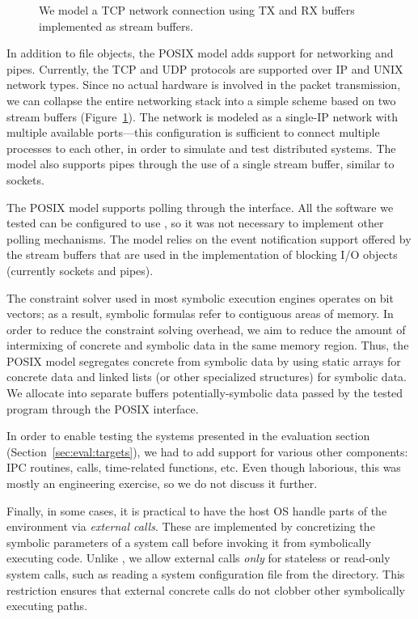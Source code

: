 \begin{figure}
  \centering
  \caption{We model a TCP network connection using TX and RX buffers implemented as stream buffers.}
  \label{fig:networkmodel}
\end{figure}

In addition to file objects, the POSIX model adds support for networking and pipes.
%
Currently, the TCP and UDP protocols are supported over IP and UNIX network types. Since no actual hardware is involved in the packet transmission, we can collapse the entire networking stack into a simple scheme based on two stream buffers (Figure~\ref{fig:networkmodel}). The network is modeled as a single-IP network with multiple available ports---this configuration is sufficient to connect multiple processes to each other, in order to simulate and test distributed systems. The model also supports pipes through the use of a single stream buffer, similar to sockets.

The POSIX model supports polling through the  interface.
%
All the software we tested can be configured to use , so it was not necessary to implement other polling mechanisms.  The  model relies on the event notification support offered by the stream buffers that are used in the implementation of blocking I/O objects (currently sockets and pipes).

The constraint solver used in most symbolic execution engines operates on bit vectors; as a result, symbolic formulas refer to contiguous areas of memory.
%
In order to reduce the constraint solving overhead, we aim to reduce the amount of intermixing of concrete and symbolic data in the same memory region.  Thus, the POSIX model segregates concrete from symbolic data by using static arrays for concrete data and linked lists (or other specialized structures) for symbolic data.  We allocate into separate buffers potentially-symbolic data passed by the tested program through the POSIX interface.

In order to enable testing the systems presented in the evaluation section (Section~\ref{sec:eval:targets}), we had to add support for various other components: IPC routines,  calls, time-related functions, etc.
%
Even though laborious, this was mostly an engineering exercise, so we do not discuss it further.

Finally, in some cases, it is practical to have the host OS handle parts of the environment via \emph{external calls}.
%
These are implemented by concretizing the symbolic parameters of a system call before invoking it from symbolically executing code. Unlike \cite{dart,klee,exe}, we allow external calls \emph{only} for stateless or read-only system calls, such as reading a system configuration file from the  directory.  This restriction ensures that external concrete calls do not clobber other symbolically executing paths.

